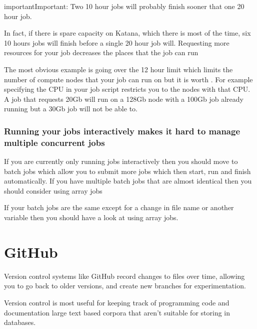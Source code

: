 \documentclass[letterpaper,10pt,english]{sphinxmanual}
\begin{document}
\begin{sphinxadmonition}{important}{Important:}
Two 10 hour jobs will probably finish sooner that one 20 hour job.
\end{sphinxadmonition}

In fact, if there is spare capacity on Katana, which there is most of the time, six 10 hours jobs will finish before a single 20 hour job will.
Requesting more resources for your job decreases the places that the job can run

The most obvious example is going over the 12 hour limit which limits the number of compute nodes that your job can run on but it is worth . For example specifying the CPU in your job script restricts you to the nodes with that CPU. A job that requests 20Gb will run on a 128Gb node with a 100Gb job already running but a 30Gb job will not be able to.


\subsubsection{Running your jobs interactively makes it hard to manage multiple concurrent jobs}
\label{\detokenize{using_katana/running_jobs:running-your-jobs-interactively-makes-it-hard-to-manage-multiple-concurrent-jobs}}
If you are currently only running jobs interactively then you should move to batch jobs which allow you to submit more jobs which then start, run and finish automatically.
If you have multiple batch jobs that are almost identical then you should consider using array jobs

If your batch jobs are the same except for a change in file name or another variable then you should have a look at using array jobs.


\section{GitHub}
\label{\detokenize{using_katana/github:github}}\label{\detokenize{using_katana/github::doc}}
Version control systems like GitHub record changes to files over time, allowing you to go back to older versions, and create new branches for experimentation.

Version control is most useful for keeping track of programming code and documentation \sphinxhyphen{} large text based corpora that aren’t suitable for storing in databases.
\end{document}
